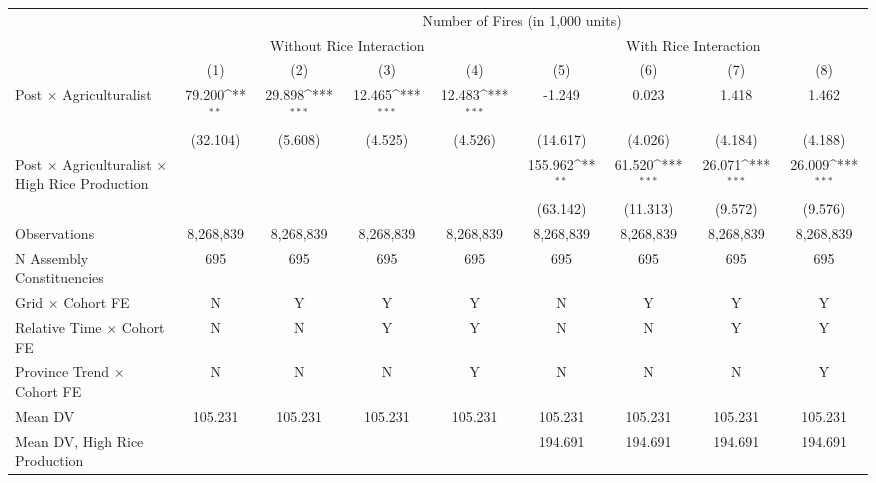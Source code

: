 {\def\sym#1{\ifmmode^{#1}\else\(^{#1}\)\fi}
\begin{tabular}{l*{8}{c}}
\hline
 & \multicolumn{8}{c}{Number of Fires (in 1,000 units)} \\
 & \multicolumn{4}{c}{Without Rice Interaction} & \multicolumn{4}{c}{With Rice Interaction} \\
 & (1) & (2) & (3) & (4) & (5) & (6) & (7) & (8) \\ \hline

Post $\times$ Agriculturalist&      79.200\sym{**} &      29.898\sym{***}&      12.465\sym{***}&      12.483\sym{***}&      -1.249         &       0.023         &       1.418         &       1.462         \\
            &    (32.104)         &     (5.608)         &     (4.525)         &     (4.526)         &    (14.617)         &     (4.026)         &     (4.184)         &     (4.188)         \\
Post $\times$ Agriculturalist $\times$ High Rice Production&                     &                     &                     &                     &     155.962\sym{**} &      61.520\sym{***}&      26.071\sym{***}&      26.009\sym{***}\\
            &                     &                     &                     &                     &    (63.142)         &    (11.313)         &     (9.572)         &     (9.576)         \\
\hline
Observations&   8,268,839         &   8,268,839         &   8,268,839         &   8,268,839         &   8,268,839         &   8,268,839         &   8,268,839         &   8,268,839         \\
N Assembly Constituencies&         695         &         695         &         695         &         695         &         695         &         695         &         695         &         695         \\
Grid $\times$ Cohort FE&           N         &           Y         &           Y         &           Y         &           N         &           Y         &           Y         &           Y         \\
Relative Time $\times$ Cohort FE&           N         &           N         &           Y         &           Y         &           N         &           N         &           Y         &           Y         \\
Province Trend $\times$ Cohort FE&           N         &           N         &           N         &           Y         &           N         &           N         &           N         &           Y         \\
Mean DV     &     105.231         &     105.231         &     105.231         &     105.231         &     105.231         &     105.231         &     105.231         &     105.231         \\
Mean DV, High Rice Production&                     &                     &                     &                     &     194.691         &     194.691         &     194.691         &     194.691         \\
\hline
\end{tabular}
}
